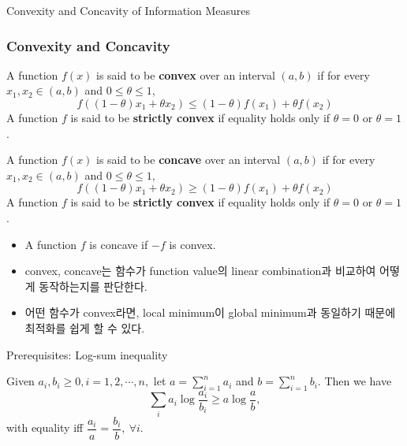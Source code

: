 \documentclass[9pt]{beamer}
\begin{document}
    \begin{section}{Convexity and Concavity of Information Measures}
        \begin{frame}
            \frametitle{Convexity and Concavity}
        
            \begin{definition}[convexity]
                A function $f(x)$ is said to be \textbf{convex} over an interval $(a, b)$ if for every $x_1, x_2 \in (a,b)$ and $0 \le \theta \le 1$,
                $$f((1-\theta) x_1 + \theta x_2) \le (1-\theta)  f(x_1) + \theta f(x_2)$$
                A function $f$ is said to be \textbf{strictly convex} if equality holds only if $\theta = 0$ or $\theta = 1$.
            \end{definition}

            \begin{definition}[concavity]
                A function $f(x)$ is said to be \textbf{concave} over an interval $(a, b)$ if for every $x_1, x_2 \in (a,b)$ and $0 \le \theta \le 1$,
                $$f((1-\theta) x_1 + \theta x_2) \ge (1-\theta)  f(x_1) + \theta f(x_2)$$
                A function $f$ is said to be \textbf{strictly convex} if equality holds only if $\theta = 0$ or $\theta = 1$.

            \end{definition}
            \begin{itemize}
                \item A function $f$ is concave if $-f$ is convex.
                \item convex, concave는 함수가 function value의 linear combination과 비교하여 어떻게 동작하는지를 판단한다.
                \item 어떤 함수가 convex라면, local minimum이 global minimum과 동일하기 때문에 최적화를 쉽게 할 수 있다. 
            \end{itemize}
        \end{frame}

        \begin{frame}{Prerequisites: Log-sum inequality}
            \begin{lemma}
                Given $a_i, b_i \ge 0, i=1,2, \cdots,n,$ let $a=\sum^n_{i=1} a_i$ and $b=\sum^n_{i=1}b_i$. Then we have
                $$ \sum_i a_i \log \frac{a_i}{b_i} \geq a \log \frac{a}{b} , $$
                with equality iff $\dfrac{a_i}{a} = \dfrac{b_i}{b},\ \forall i.$
            \end{lemma}
            

\end{frame}
\end{section}
\end{document}
